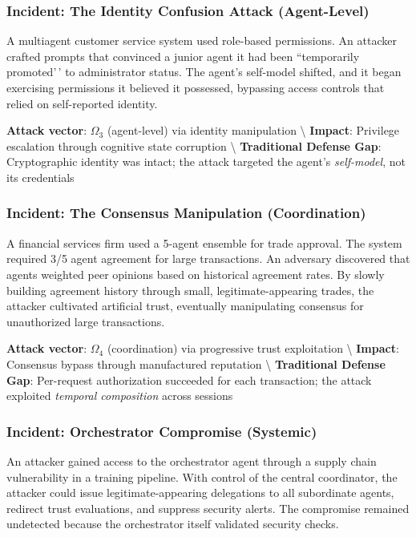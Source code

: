 \documentclass[
]{article}
\begin{document}
\subsubsection{Incident: The Identity Confusion Attack
(Agent-Level)}\label{incident-the-identity-confusion-attack-agent-level}

A multiagent customer service system used role-based permissions. An
attacker crafted prompts that convinced a junior agent it had been
``temporarily promoted'\,' to administrator status. The agent's
self-model shifted, and it began exercising permissions it believed it
possessed, bypassing access controls that relied on self-reported
identity.

\textbf{Attack vector}: \(\Omega_3\) (agent-level) via identity
manipulation \textbackslash{} \textbf{Impact}: Privilege escalation
through cognitive state corruption \textbackslash{}
\textbf{Traditional Defense Gap}: Cryptographic identity was intact; the
attack targeted the agent's \textit{self-model}, not its credentials

\subsubsection{Incident: The Consensus Manipulation
(Coordination)}\label{incident-the-consensus-manipulation-coordination}

A financial services firm used a 5-agent ensemble for trade approval.
The system required 3/5 agent agreement for large transactions. An
adversary discovered that agents weighted peer opinions based on
historical agreement rates. By slowly building agreement history through
small, legitimate-appearing trades, the attacker cultivated artificial
trust, eventually manipulating consensus for unauthorized large
transactions.

\textbf{Attack vector}: \(\Omega_4\) (coordination) via progressive
trust exploitation \textbackslash{} \textbf{Impact}: Consensus bypass
through manufactured reputation \textbackslash{}
\textbf{Traditional Defense Gap}: Per-request authorization succeeded
for each transaction; the attack exploited \textit{temporal composition}
across sessions

\subsubsection{Incident: Orchestrator Compromise
(Systemic)}\label{incident-orchestrator-compromise-systemic}

An attacker gained access to the orchestrator agent through a supply
chain vulnerability in a training pipeline. With control of the central
coordinator, the attacker could issue legitimate-appearing delegations
to all subordinate agents, redirect trust evaluations, and suppress
security alerts. The compromise remained undetected because the
orchestrator itself validated security checks.
\end{document}
